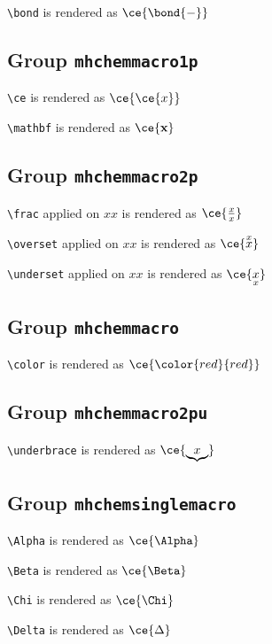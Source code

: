 \texttt{\textbackslash bond} is rendered as $\ce{\bond{-}}$

\subsection{ Group \texttt{mhchem\textunderscore macro\textunderscore 1p}}

\texttt{\textbackslash ce} is rendered as $\ce{\ce{x}}$

\texttt{\textbackslash mathbf} is rendered as $\ce{\mathbf{x}}$

\subsection{ Group \texttt{mhchem\textunderscore macro\textunderscore 2p}}

\texttt{\textbackslash frac} applied on ${x}{x}$ is rendered as $\ce{\frac{x}{x}}$

\texttt{\textbackslash overset} applied on ${x}{x}$ is rendered as $\ce{\overset{x}{x}}$

\texttt{\textbackslash underset} applied on ${x}{x}$ is rendered as $\ce{\underset{x}{x}}$

\subsection{ Group \texttt{mhchem\textunderscore macro\textunderscore 2pc}}

\texttt{\textbackslash color} is rendered as $\ce{\color{red}{red}}$

\subsection{ Group \texttt{mhchem\textunderscore macro\textunderscore 2pu}}

\texttt{\textbackslash underbrace} is rendered as $\ce{\underbrace{x}}$

\subsection{ Group \texttt{mhchem\textunderscore single\textunderscore macro}}

\texttt{\textbackslash Alpha} is rendered as $\ce{\Alpha}$

\texttt{\textbackslash Beta} is rendered as $\ce{\Beta}$

\texttt{\textbackslash Chi} is rendered as $\ce{\Chi}$

\texttt{\textbackslash Delta} is rendered as $\ce{\Delta}$


